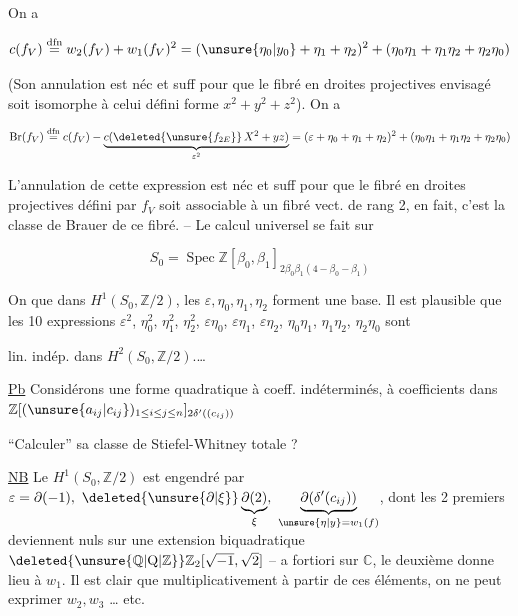 On a

\[c(f_V)\overset{\mathrm{dfn}}=w_2(f_V)+w_1(f_V)^2=(\unsure{\eta_0|y_0}+\eta_1+\eta_2)^2+(\eta_0\eta_1+\eta_1\eta_2+\eta_2\eta_0)\]

(Son annulation est néc et suff pour que le fibré en droites projectives envisagé soit isomorphe à celui défini   forme $x^2+y^2+z^2$). On a

\[\operatorname{Br}(f_V)\overset{\mathrm{dfn}}=c(f_V)-\underbrace{c(\deleted{\unsure{f_{2E}}}\,X^2+yz)}_{\varepsilon^2}=(\varepsilon+\eta_0+\eta_1+\eta_2)^2+(\eta_0\eta_1+\eta_1\eta_2+\eta_2\eta_0)\]

L'annulation de cette expression est néc et suff pour que le fibré en droites projectives  défini par $f_V$ soit associable à un fibré vect. de rang 2, en fait, c'est la classe de Brauer de ce fibré. -- Le calcul universel se fait sur

\[S_0=\operatorname{Spec}\mathbb Z[\beta_0,\beta_1]_{2\beta_0\beta_1(4-\beta_0-\beta_1)}\]

On  que dans $H^1(S_0,\mathbb Z/2)$, les   $\varepsilon,\eta_0,\eta_1,\eta_2$ forment une base. Il est plausible que les 10 expressions $\varepsilon^2$, $\eta_0^2$, $\eta_1^2$, $\eta_2^2$, $\varepsilon \eta_0$, $\varepsilon \eta_1$, $\varepsilon \eta_2$, $\eta_0\eta_1$, $\eta_1\eta_2$, $\eta_2\eta_0$ sont



lin. indép. dans $H^2(S_0,\mathbb Z/2)$.\ldots

\uline{Pb} Considérons une forme quadratique  à coeff. indéterminés, à coefficients dans $\mathbb Z[(\unsure{a_{ij}|c_{ij}})_{1\leq i\leq j\leq n}]_{2\delta^{\prime}((c_{ij}))}$

``Calculer'' sa classe de Stiefel-Whitney totale ?

\uline{NB} Le $H^1(S_0,\mathbb Z/2)$  est engendré par $\varepsilon=\partial(-1),\ \deleted{\unsure{\partial|\xi}}\underbrace{\partial(2)}_{\xi},\ \underbrace{\partial(\delta'(c_{ij}))}_{\unsure{\eta|y}=w_1(f)}$, dont les 2 premiers deviennent nuls sur une extension biquadratique $\deleted{\unsure{\mathbb Q|\mathrm Q|\mathbb Z}}\mathbb Z_2[\sqrt{-1},\sqrt{2}]$ -- a fortiori sur $\mathbb C$, le deuxième donne lieu à $w_1$. Il est  clair que multiplicativement à partir de ces éléments, on ne peut exprimer  $w_2,w_3$ \ldots{} etc.

